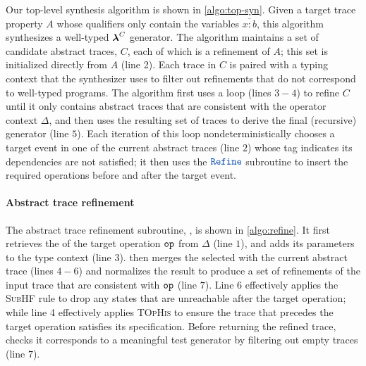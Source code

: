 Our top-level synthesis algorithm is shown in \autoref{algo:top-syn}.
Given a target trace property $A$ whose qualifiers only contain the
variables $\overline{x{:}b}$, this algorithm synthesizes a well-typed
$\boldsymbol{\lambda}^{C}{}$ generator. The algorithm maintains a set of candidate
abstract traces, $C$, each of which is a refinement of $A$; this set
is initialized directly from $A$ (line 2). Each trace in $C$ is paired
with a typing context that the synthesizer uses to filter out
refinements that do not correspond to well-typed programs. The
algorithm first uses a loop (lines $3-4$) to refine $C$ until it only
contains abstract traces that are consistent with the operator context
$\Delta$, and then uses the resulting set of traces to derive the
final (recursive) generator (line $5$). Each iteration of this loop
nondeterministically chooses a target event in one of the current
abstract traces (line $2$) whose tag indicates its dependencies are
not satisfied; it then uses the $\refine$ subroutine to insert the
required operations before and after the target event.

\paragraph{Abstract trace refinement} The abstract trace refinement
subroutine, , is shown in \autoref{algo:refine}. It first
retrieves the \tyName{} of the target operation $\boldsymbol{{\tt op}}$ from
$\Delta$ (line $1$), and adds its parameters to the type context (line
$3$).  then merges the selected \tyName{} with the current
abstract trace (lines $4-6$) and normalizes the result to produce a
set of refinements of the input trace that are consistent with
$\boldsymbol{{\tt op}}$ (line $7$).  Line $6$ effectively applies the
\textsc{SubHF} rule to drop any states that are unreachable after the
target operation; while line 4 effectively applies \textsc{TOpHis} to
ensure the trace that precedes the target operation satisfies its
specification.
Before returning the refined trace,  checks it
corresponds to a meaningful test generator by filtering out empty
traces (line $7$).

